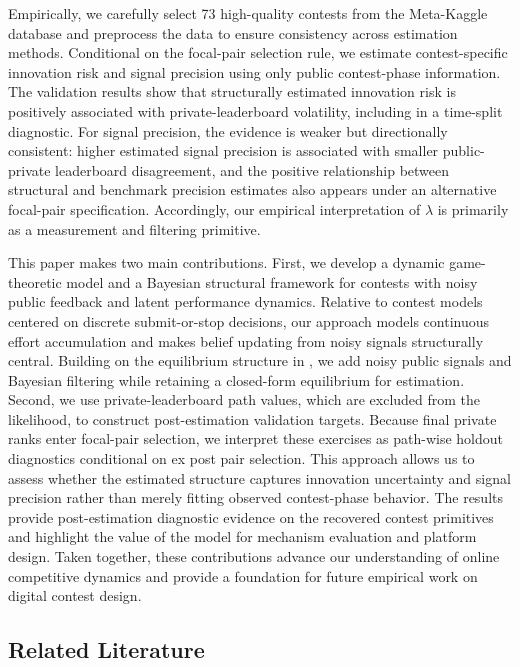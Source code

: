 \documentclass[mnsc]{informs3}
\begin{document}
Empirically, we carefully select 73 high-quality contests from the Meta-Kaggle database and preprocess the data to ensure consistency across estimation methods.
Conditional on the focal-pair selection rule, we estimate contest-specific innovation risk and signal precision using only public contest-phase information.
The validation results show that structurally estimated innovation risk is positively associated with private-leaderboard volatility, including in a time-split diagnostic.
For signal precision, the evidence is weaker but directionally consistent: higher estimated signal precision is associated with smaller public-private leaderboard disagreement, and the positive relationship between structural and benchmark precision estimates also appears under an alternative focal-pair specification.
Accordingly, our empirical interpretation of $\lambda$ is primarily as a measurement and filtering primitive.


This paper makes two main contributions.
First, we develop a dynamic game-theoretic model and a Bayesian structural framework for contests with noisy public feedback and latent performance dynamics.
Relative to contest models centered on discrete submit-or-stop decisions, our approach models continuous effort accumulation and makes belief updating from noisy signals structurally central.
Building on the equilibrium structure in \citet{Ryvkin2022Fight}, we add noisy public signals and Bayesian filtering while retaining a closed-form equilibrium for estimation.
Second, we use private-leaderboard path values, which are excluded from the likelihood, to construct post-estimation validation targets. Because final private ranks enter focal-pair selection, we interpret these exercises as path-wise holdout diagnostics conditional on ex post pair selection.
This approach allows us to assess whether the estimated structure captures innovation uncertainty and signal precision rather than merely fitting observed contest-phase behavior.
The results provide post-estimation diagnostic evidence on the recovered contest primitives and highlight the value of the model for mechanism evaluation and platform design.
Taken together, these contributions advance our understanding of online competitive dynamics and provide a foundation for future empirical work on digital contest design.



\subsection{Related Literature}
\end{document}

